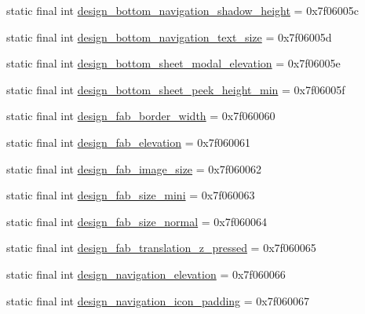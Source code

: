 \begin{DoxyCompactItemize}
\item 
static final int \mbox{\hyperlink{classandroid_1_1support_1_1design_1_1_r_1_1dimen_a75128c578ffc4c320a46382a28fa3501}{design\+\_\+bottom\+\_\+navigation\+\_\+shadow\+\_\+height}} = 0x7f06005c
\item 
static final int \mbox{\hyperlink{classandroid_1_1support_1_1design_1_1_r_1_1dimen_a48251c3129267204da46c54fae4d0e9e}{design\+\_\+bottom\+\_\+navigation\+\_\+text\+\_\+size}} = 0x7f06005d
\item 
static final int \mbox{\hyperlink{classandroid_1_1support_1_1design_1_1_r_1_1dimen_a36b589950beca95dbbf0d753945704dc}{design\+\_\+bottom\+\_\+sheet\+\_\+modal\+\_\+elevation}} = 0x7f06005e
\item 
static final int \mbox{\hyperlink{classandroid_1_1support_1_1design_1_1_r_1_1dimen_a123a533a83598358ea6371e77a861117}{design\+\_\+bottom\+\_\+sheet\+\_\+peek\+\_\+height\+\_\+min}} = 0x7f06005f
\item 
static final int \mbox{\hyperlink{classandroid_1_1support_1_1design_1_1_r_1_1dimen_af4f3a9ee873d7757d2dd0be1c2cadf4b}{design\+\_\+fab\+\_\+border\+\_\+width}} = 0x7f060060
\item 
static final int \mbox{\hyperlink{classandroid_1_1support_1_1design_1_1_r_1_1dimen_a6fe7a893bf5c66341ebde39a58bdcf97}{design\+\_\+fab\+\_\+elevation}} = 0x7f060061
\item 
static final int \mbox{\hyperlink{classandroid_1_1support_1_1design_1_1_r_1_1dimen_a97b98ab868e0031b5a7d4931870db647}{design\+\_\+fab\+\_\+image\+\_\+size}} = 0x7f060062
\item 
static final int \mbox{\hyperlink{classandroid_1_1support_1_1design_1_1_r_1_1dimen_ad2f1e3630649a6bf663595a91a73bb75}{design\+\_\+fab\+\_\+size\+\_\+mini}} = 0x7f060063
\item 
static final int \mbox{\hyperlink{classandroid_1_1support_1_1design_1_1_r_1_1dimen_a1149e0b937576ec45f347e32bd7c0995}{design\+\_\+fab\+\_\+size\+\_\+normal}} = 0x7f060064
\item 
static final int \mbox{\hyperlink{classandroid_1_1support_1_1design_1_1_r_1_1dimen_a51c58f3bb12ba528b250d93588890122}{design\+\_\+fab\+\_\+translation\+\_\+z\+\_\+pressed}} = 0x7f060065
\item 
static final int \mbox{\hyperlink{classandroid_1_1support_1_1design_1_1_r_1_1dimen_aefa62bedc2505b09d491e969011487c7}{design\+\_\+navigation\+\_\+elevation}} = 0x7f060066
\item 
static final int \mbox{\hyperlink{classandroid_1_1support_1_1design_1_1_r_1_1dimen_ae84d41ce904136aaafbbd73e8d23ed55}{design\+\_\+navigation\+\_\+icon\+\_\+padding}} = 0x7f060067

\end{DoxyCompactItemize}
